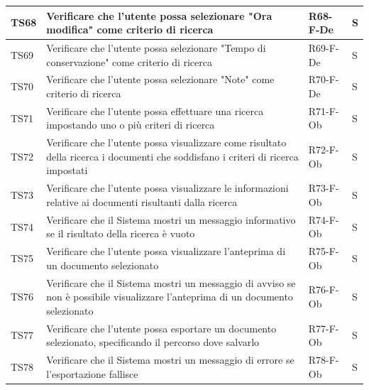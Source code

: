\documentclass[a4paper,12pt]{article}
\begin{document}
\begin{longtable}{|M{1.2cm}|M{6.3cm}|M{2.5cm}|M{1.5cm}|}
                TS68 & Verificare che l'utente possa selezionare "Ora modifica" come criterio di ricerca & R68-F-De & S \\
                \hline

                TS69 & Verificare che l'utente possa selezionare "Tempo di conservazione" come criterio di ricerca & R69-F-De & S \\
                \hline

                TS70 & Verificare che l'utente possa selezionare "Note" come criterio di ricerca & R70-F-De & S \\
                \hline

                TS71 & Verificare che l'utente possa effettuare una ricerca impostando uno o più criteri di ricerca & R71-F-Ob & S \\
                \hline

                TS72 & Verificare che l'utente possa visualizzare come risultato della ricerca i documenti che soddisfano i criteri di ricerca impostati & R72-F-Ob & S \\
                \hline

                TS73 & Verificare che l'utente possa visualizzare le informazioni relative ai documenti risultanti dalla ricerca & R73-F-Ob & S \\
                \hline

                TS74 & Verificare che il Sistema mostri un messaggio informativo se il risultato della ricerca è vuoto & R74-F-Ob & S \\
                \hline

                TS75 & Verificare che l'utente possa visualizzare l'anteprima di un documento selezionato & R75-F-Ob & S \\
                \hline

                TS76 & Verificare che il Sistema mostri un messaggio di avviso se non è possibile visualizzare l'anteprima di un documento selezionato & R76-F-Ob & S \\
                \hline

                TS77 & Verificare che l'utente possa esportare un documento selezionato, specificando il percorso dove salvarlo & R77-F-Ob & S \\
                \hline

                TS78 & Verificare che il Sistema mostri un messaggio di errore se l'esportazione fallisce & R78-F-Ob & S \\
                \hline


\end{longtable}
\end{document}
